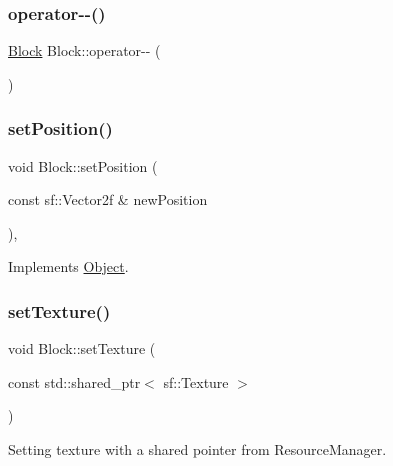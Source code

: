 \subsubsection{\texorpdfstring{operator-\/-\/()}{operator--()}}
{\footnotesize\ttfamily \mbox{\hyperlink{class_block}{Block}} Block\+::operator-\/-\/ (\begin{DoxyParamCaption}{ }\end{DoxyParamCaption})}

\mbox{\label{class_block_a9c4782f321b4760d572a01bd31c42a06}} 
\subsubsection{\texorpdfstring{setPosition()}{setPosition()}}
{\footnotesize\ttfamily void Block\+::set\+Position (\begin{DoxyParamCaption}\item[{const sf\+::\+Vector2f \&}]{new\+Position }\end{DoxyParamCaption})\hspace{0.3cm}{\ttfamily [inline]}, {\ttfamily [virtual]}}



Implements \mbox{\hyperlink{class_object_ac5c796bfa75dedf6d3bfc74685b2b77d}{Object}}.

\mbox{\label{class_block_a01ef735022e9a92357e00cca6228f7b7}} 
\subsubsection{\texorpdfstring{setTexture()}{setTexture()}\hspace{0.1cm}{\footnotesize\ttfamily [1/2]}}
{\footnotesize\ttfamily void Block\+::set\+Texture (\begin{DoxyParamCaption}\item[{const std\+::shared\+\_\+ptr$<$ sf\+::\+Texture $>$}]{ }\end{DoxyParamCaption})}



Setting texture with a shared pointer from Resource\+Manager. 

\mbox{\label{class_block_a866e57c9df2c81910879ef991670931e}} 
